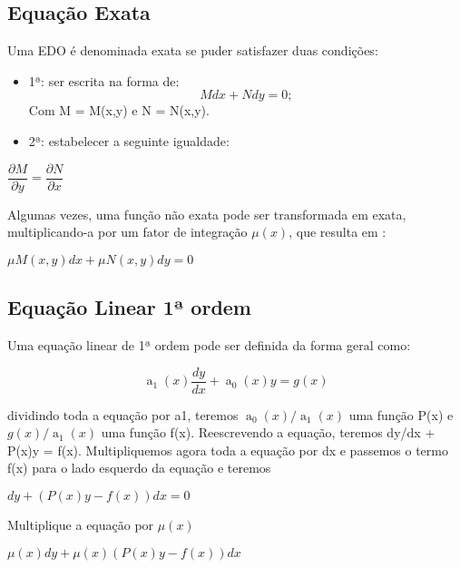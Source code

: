 \subsection[Equação Exata]{Equação Exata}

Uma EDO é denominada exata se puder satisfazer duas condições: 

\begin{itemize}
\item{1ª:} ser escrita na forma de: 
\begin{equation}
Mdx + Ndy = 0;
\end{equation}
Com M = M(x,y) e N = N(x,y).
\item{2ª:} estabelecer a seguinte igualdade:
\end{itemize}

\begin{center}
$ \dfrac{ \partial M}{ \partial y} =  \dfrac{ \partial  N}{ \partial x} $
\end{center}

Algumas vezes, uma função não exata pode ser transformada em exata, multiplicando-a por um fator de integração $\mu(x)$, que resulta em : 

\begin{center}
$ \mu M(x,y)dx + \mu N(x,y)dy = 0 $
\end{center}

\subsection[Equação Linear 1ª ordem]{Equação Linear 1ª ordem}
Uma equação linear de 1ª ordem pode ser definida da forma geral como: 

\begin{equation} \label{formaLinear}
  \operatorname{a}_{1}(x)\dfrac{dy}{dx} + \operatorname{a}_{0}(x)y = g(x) 
\end{equation}

dividindo toda a equação por a1, teremos   $ \operatorname{a}_{0}(x)/\operatorname{a}_{1}(x) $  uma função P(x)  e $ g(x)/\operatorname{a}_{1}(x) $ uma função f(x). 
Reescrevendo a equação, teremos dy/dx + P(x)y = f(x). Multipliquemos agora toda a equação por dx e passemos o termo f(x) para o lado esquerdo da equação e teremos
\begin{center}
$ dy + (P(x)y - f(x))dx = 0 $
\end{center}

Multiplique a equação por $\mu(x)$

\begin{center}
$\mu(x)dy + \mu(x)(P(x)y - f(x))dx $
\end{center}

